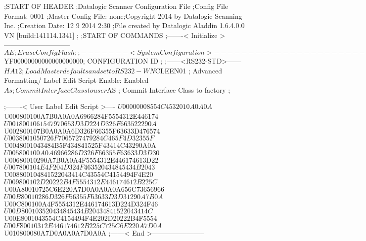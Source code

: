 ;START OF HEADER
;Datalogic Scanner Configuration File
;Config File Format: 0001
;Master Config File: none;Copyright 2014 by Datalogic Scanning Inc.
;Creation Date: 12 9 2014 2:30
;File created by Datalogic Aladdin 1.6.4.0.0 VN [build:141114.1341]
;
;START OF COMMANDS
;-------< Initialize >-----------------------------
$AE                 ; Erase Config Flash
;
;-------< System Configuration >-------------------------------
$YF00000000000000000000; CONFIGURATION ID
;
;------<RS232-STD>------
$HA12               ; Load Master defaults and set to RS232-WN
$CLEEN01            ; Advanced Formatting/ Label Edit Script Enable: Enabled
$As                 ; Commit Interface Class to user
$AS                 ; Commit Interface Class to factory
;

;-------< User Label Edit Script >----
$U00000008554C4532010A0A0A
$U000800100A7B0A0A0A6966284F5554312E446174
$U0018001061547970653D3D224D326F663522290A
$U002800107B0A0A0A6D326F66355F63633D476574
$U0038001050726F7065727479284C465F4D32355F
$U0048001043484B5F434841525F43414C43290A0A
$U005800100A0A6966286D326F66355F63633D3D30
$U00680010290A7B0A0A4F5554312E446174613D22
$U007800104E4F204D324F463520434845434B2043
$U008800104841522043414C43554C4154494F4E20
$U009800102D20222B4F5554312E446174612B225C
$U00A80010725C6E220A7D0A0A0A0A656C73656966
$U00B80010286D326F66355F63633D3D31290A7B0A
$U00C800100A4F5554312E446174613D224D324F46
$U00D800103520434845434B20434841522043414C
$U00E8001043554C4154494F4E202D20222B4F5554
$U00F80010312E446174612B225C725C6E220A7D0A
$U010800080A7D0A0A0A7D0A0A
;------< End >-----------------------
